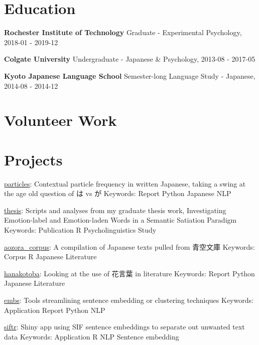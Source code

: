 \documentclass[letterpaper]{deedy-resume_sm}
\begin{document}
\section{Education}
\textbf{Rochester Institute of Technology}
Graduate - Experimental Psychology, 2018-01 - 2019-12

\textbf{Colgate University}
Undergraduate - Japanese \& Psychology, 2013-08 - 2017-05

\textbf{Kyoto Japanese Language School}
Semester-long Language Study - Japanese, 2014-08 - 2014-12

\section{Volunteer Work}

\section{Projects}
\href{https://github.com/ryancahildebrandt/particles}{particles}: Contextual particle frequency in written Japanese, taking a swing at the age old question of は vs が
Keywords: Report \textbullet{} Python \textbullet{} Japanese \textbullet{} NLP

\href{https://github.com/ryancahildebrandt/thesis}{thesis}: Scripts and analyses from my graduate thesis work, Investigating Emotion-label and Emotion-laden Words in a Semantic Satiation Paradigm
Keywords: Publication \textbullet{} R \textbullet{} Psycholinguistics \textbullet{} Study

\href{https://github.com/ryancahildebrandt/aozora_corpus}{aozora{\_}corpus}: A compilation of Japanese texts pulled from 青空文庫
Keywords: Corpus \textbullet{} R \textbullet{} Japanese \textbullet{} Literature

\href{https://github.com/ryancahildebrandt/hanakotoba}{hanakotoba}: Looking at the use of 花言葉 in literature 
Keywords: Report \textbullet{} Python \textbullet{} Japanese \textbullet{} Literature

\href{https://github.com/ryancahildebrandt/embs}{embs}: Tools streamlining sentence embedding or clustering techniques
Keywords: Application \textbullet{} Report \textbullet{} Python \textbullet{} NLP

\href{https://github.com/ryancahildebrandt/siftr}{siftr}: Shiny app using SIF sentence embeddings to separate out unwanted text data
Keywords: Application \textbullet{} R \textbullet{} NLP \textbullet{} Sentence embedding
\end{document}
